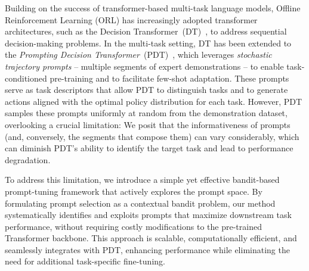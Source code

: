 \documentclass{article}
\begin{document}
Building on the success of transformer-based multi-task language models, Offline Reinforcement Learning (ORL) has increasingly adopted transformer architectures, such as the Decision Transformer~(DT)~\citep{chen2021decision}, to address sequential decision-making problems. In the multi-task setting, DT has been extended to the \textit{Prompting Decision Transformer}~(PDT)~\citep{xu2022prompting}, which leverages \textit{stochastic trajectory prompts} -- multiple segments of expert demonstrations -- to enable task-conditioned pre-training and to facilitate few-shot adaptation. These prompts serve as task descriptors that allow PDT to distinguish tasks and to generate actions aligned with the optimal policy distribution for each task. 
However, PDT samples these prompts uniformly at random from the demonstration dataset, overlooking a crucial limitation: We posit that the informativeness of prompts (and, conversely, the segments that compose them) can vary considerably, which can diminish PDT's ability to identify the target task and lead to performance degradation.



To address this limitation, we introduce a simple yet effective bandit-based prompt-tuning framework that actively explores the prompt space. By formulating prompt selection as a contextual bandit problem, our method systematically identifies and exploits prompts that maximize downstream task performance, without requiring costly modifications to the pre-trained Transformer backbone. This approach is scalable, computationally efficient, and seamlessly integrates with PDT, enhancing performance while eliminating the need for additional task-specific fine-tuning.
\end{document}
